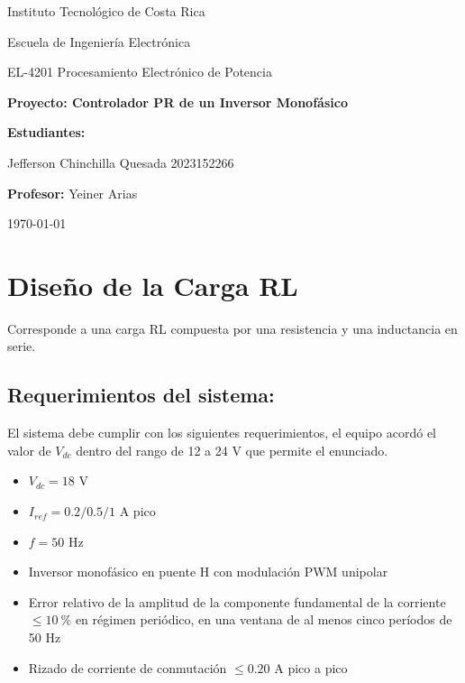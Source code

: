 \documentclass[spanish,10pt,a4paper,titlepage]{article}
\newcommand{\universidad}{Instituto Tecnológico de Costa Rica}
\newcommand{\escuela}{Escuela de Ingeniería Electrónica}
\newcommand{\curso}{EL-4201 Procesamiento Electrónico de Potencia}
\newcommand{\profesor}{Yeiner Arias}
\newcommand{\tarea}{Proyecto: Controlador PR de un Inversor Monofásico}
\newcommand{\fechaEntrega}{\today}
\newcommand{\estudiantes}{
	Jefferson Chinchilla Quesada  \hspace{1cm} 2023152266 \\
	
}
\begin{document}
	\begin{titlepage}
		\centering
		{\large \universidad \par}
		{\large \escuela \par}
		\vspace{2cm}
		
		{\Large \curso \par}
		\vspace{0.5cm}
		{\huge \bfseries \tarea \par}
		\vspace{2cm}
		
		{\large \textbf{Estudiantes:} \par}
		\vspace{0.3cm}
		\estudiantes
		
		\vspace{2cm}
		{\large \textbf{Profesor:} \profesor \par}
		
		\vfill
		
		{\large \fechaEntrega \par}
	\end{titlepage}
	
	\section{Diseño de la Carga RL}
	Corresponde a una carga RL compuesta por una resistencia y una inductancia en serie.
	\subsection{Requerimientos del sistema:}
	El sistema debe cumplir con los siguientes requerimientos, el equipo acordó el valor de $V_{dc}$ dentro del rango de 12 a 24 V que permite el enunciado.
	\vspace{0.3 cm}
	\begin{itemize}
		\item $V_{dc} = 18$ V
		\item $I_{ref} = 0.2 / 0.5 / 1$ A pico
		\item $f = 50 \text{ Hz}$
		\item Inversor monofásico en puente H con modulación PWM unipolar
		\item Error relativo de la amplitud de la componente fundamental de la corriente $\leq 10\ \%$ en régimen periódico, en una ventana de al menos cinco períodos de 50 Hz
		\item Rizado de corriente de conmutación $\leq 0.20$ A pico a pico
	\end{itemize}
\end{document}
